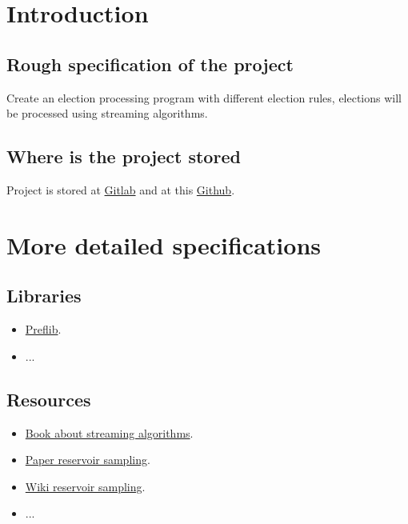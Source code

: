\documentclass[a4paper,12pt]{report}
\begin{document}
	\pagestyle{toc}
	\tableofcontents
	\cleardoublepage
	\pagestyle{plain}
	\pagebreak
	
	\chapter{Introduction}
	
	\section{Rough specification of the project}
	
	Create an election processing program with different election rules, elections will be processed using streaming algorithms.
	
	\section{Where is the project stored}
	
	Project is stored at \href{https://gitlab.com/adam_b3n3s/vote_streams}{Gitlab} and at this \href{https://github.com/AdamBenes3/vote_streams}{Github}.
	
	\chapter{More detailed specifications}
	
	\section{Libraries}
	
	\begin{itemize}
		\item \href{https://github.com/PrefLib}{Preflib}.
		\item ...
	\end{itemize}
	
	\section{Resources}
	
	\begin{itemize}
		\item \href{http://dimacs.rutgers.edu/~graham/ssbd.html}{Book about streaming algorithms}.
		\item \href{https://dl.acm.org/doi/pdf/10.1145/198429.198435 }{Paper reservoir sampling}.
		\item \href{https://en.wikipedia.org/wiki/Reservoir_sampling}{Wiki reservoir sampling}.
		\item ...
	\end{itemize}
	
\end{document}
